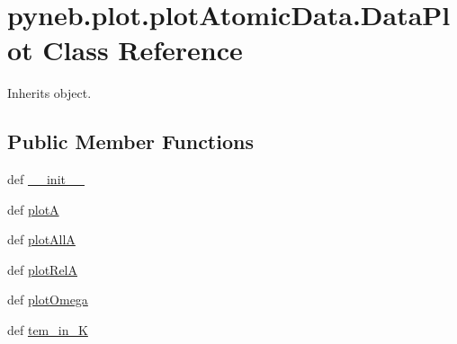 \hypertarget{classpyneb_1_1plot_1_1plot_atomic_data_1_1_data_plot}{\section{pyneb.\-plot.\-plot\-Atomic\-Data.\-Data\-Plot Class Reference}
\label{classpyneb_1_1plot_1_1plot_atomic_data_1_1_data_plot}
}


Inherits object.

\subsection*{Public Member Functions}
\begin{DoxyCompactItemize}
\item 
def \hyperlink{classpyneb_1_1plot_1_1plot_atomic_data_1_1_data_plot_af4b7b5510131c31e072909a6d20637c3}{\-\_\-\-\_\-init\-\_\-\-\_\-}
\item 
def \hyperlink{classpyneb_1_1plot_1_1plot_atomic_data_1_1_data_plot_a389e18b521d2052577494c8611cb5c80}{plot\-A}
\item 
def \hyperlink{classpyneb_1_1plot_1_1plot_atomic_data_1_1_data_plot_a0b245c7f8b97681b15beadcef38a0021}{plot\-All\-A}
\item 
def \hyperlink{classpyneb_1_1plot_1_1plot_atomic_data_1_1_data_plot_a9fc5e1df4de9471e26b20018ce89eb9d}{plot\-Rel\-A}
\item 
def \hyperlink{classpyneb_1_1plot_1_1plot_atomic_data_1_1_data_plot_a674c04e8512a9f5724c2af0df4e0a8fe}{plot\-Omega}
\item 
def \hyperlink{classpyneb_1_1plot_1_1plot_atomic_data_1_1_data_plot_a44a19b283355d6c3ad1903e70009cfee}{tem\-\_\-in\-\_\-\-K}
\end{DoxyCompactItemize}
